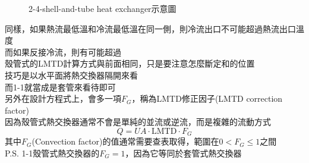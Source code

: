 \documentclass[../main.tex]{subfiles}
\begin{document}
\begin{itemize}
\begin{enumerate}
\begin{itemize}
\begin{figure}[H]
        \caption{2-4-shell-and-tube heat exchanger示意圖}
      \end{figure}
      同樣，如果熱流最低溫和冷流最低溫在同一側，則冷流出口不可能超過熱流出口溫度\\
      而如果反接冷流，則有可能超過\\
      殼管式的LMTD計算方式與前面相同，只是要注意怎麼斷定和的位置\\
      技巧是以水平面將熱交換器隔開來看\\
      而1-1就當成是套管來看待即可\\
      另外在設計方程式上，會多一項$F_G$，稱為LMTD修正因子(LMTD correction factor)\\
      因為殼管式熱交換器通常不會是單純的並流或逆流，而是複雜的流動方式
      \begin{equation}
        Q = U A \cdot \text{LMTD} \cdot F_G
      \end{equation}
      其中$F_G$(Convection factor)的值通常需要查表取得，範圍在$0 < F_G \leq 1$之間\\
      P.S. 1-1殼管式熱交換器的$F_G = 1$，因為它等同於套管式熱交換器
    \end{itemize}
  \end{enumerate}
\end{itemize}
\end{document}
